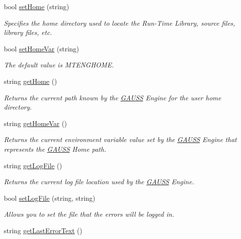 \begin{DoxyCompactItemize}
bool \hyperlink{class_g_a_u_s_s_af1f5a5df0c904bd713c4edea74606e55}{set\-Home} (string)
\begin{DoxyCompactList}\small\item\em Specifies the home directory used to locate the Run-\/\-Time Library, source files, library files, etc. \end{DoxyCompactList}\item 
bool \hyperlink{class_g_a_u_s_s_a61b2ebc8c6ac5694e8cc33cb7726cbe3}{set\-Home\-Var} (string)
\begin{DoxyCompactList}\small\item\em The default value is {\ttfamily M\-T\-E\-N\-G\-H\-O\-M\-E}. \end{DoxyCompactList}\item 
string \hyperlink{class_g_a_u_s_s_adfe744665cc891f5288d5523083d2a2c}{get\-Home} ()
\begin{DoxyCompactList}\small\item\em Returns the current path known by the \hyperlink{class_g_a_u_s_s}{G\-A\-U\-S\-S} Engine for the user home directory. \end{DoxyCompactList}\item 
string \hyperlink{class_g_a_u_s_s_abb13d8fd5b2abd2844e48279621204e6}{get\-Home\-Var} ()
\begin{DoxyCompactList}\small\item\em Returns the current environment variable value set by the \hyperlink{class_g_a_u_s_s}{G\-A\-U\-S\-S} Engine that represents the \hyperlink{class_g_a_u_s_s}{G\-A\-U\-S\-S} Home path. \end{DoxyCompactList}\item 
string \hyperlink{class_g_a_u_s_s_ad9c991ab9fd7dea25a865eb1deae9b4c}{get\-Log\-File} ()
\begin{DoxyCompactList}\small\item\em Returns the current log file location used by the \hyperlink{class_g_a_u_s_s}{G\-A\-U\-S\-S} Engine. \end{DoxyCompactList}\item 
bool \hyperlink{class_g_a_u_s_s_a59f4b84f55f76701ca9deb7be3f9f0fe}{set\-Log\-File} (string, string)
\begin{DoxyCompactList}\small\item\em Allows you to set the file that the errors will be logged in. \end{DoxyCompactList}\item 
string \hyperlink{class_g_a_u_s_s_a048aa287aa5d82638aff68f4d4cbec28}{get\-Last\-Error\-Text} ()

\end{DoxyCompactItemize}
